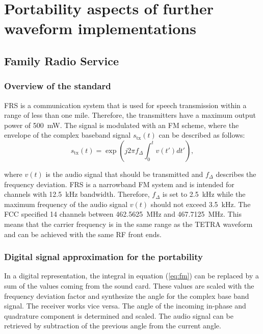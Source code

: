 \chapter{Portability aspects of further waveform implementations}
\label{chap:further}

\section{Family Radio Service}
\subsection{Overview of the standard}
\ac{FRS} is a communication system that is used for speech transmission within a range of less than one mile. Therefore, the transmitters have a maximum output power of \SI{500}{mW}. The signal is modulated with an \ac{FM} scheme, where the envelope of the complex baseband signal $s_\text{tx}(t)$ can be described as follows:
\begin{equation}
s_\text{tx}(t) = \exp \left(j 2 \pi  f_\Delta \int_0^t v(t') dt' \right),
\label{eq:fm}
\end{equation} 

where $v(t)$ is the audio signal that should be transmitted and $f_\Delta$ describes the frequency deviation. FRS is a narrowband FM system and is intended for channels with \SI{12.5}{kHz} bandwidth. Therefore, $f_\Delta$ is set to \SI{2.5}{kHz} while the maximum frequency of the audio signal $v(t)$ should not exceed \SI{3.5}{kHz}. The \ac{FCC} specified 14 channels between \SI{462.5625}{MHz} and 	\SI{467.7125}{MHz}. This means that the carrier frequency is in the same range as the TETRA waveform and can be achieved with the same RF front ends.

\subsection{Digital signal approximation for the portability}
In a digital representation, the integral in equation (\ref{eq:fm}) can be replaced by a sum of the values coming from the sound card. These values are scaled with the frequency deviation factor and synthesize the angle for the complex base band signal. The receiver works vice versa. The angle of the incoming in-phase and quadrature component is determined and scaled. The audio signal can be retrieved by subtraction of the previous angle from the current angle. 


